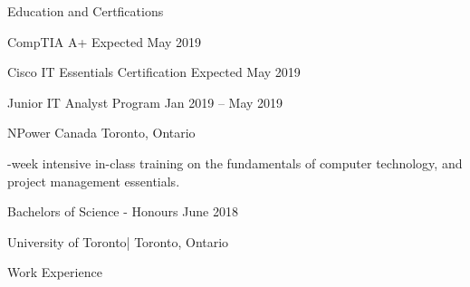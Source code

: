 \documentclass{article}
\begin{document}
\begin{center}
    \textcolor{ablue} \large{Education and Certfications}
\end{center}

\begin{doublespacing}

\noindent CompTIA A+    
\hfill Expected May 2019

\noindent Cisco IT Essentials Certification
\hfill Expected May 2019 

\noindent Junior IT Analyst Program 
\hfill Jan 2019 – May 2019 

\noindent NPower Canada \vert   Toronto, Ontario 

-week intensive in-class training on the fundamentals of computer technology, and project management essentials.

\noindent Bachelors of Science - Honours 
\hfill June 2018 

\noindent University of Toronto| Toronto, Ontario

\end{doublespacing}

\begin{center}
\textcolor{ablue} \large{Work Experience}
\end{center}
\end{document}
